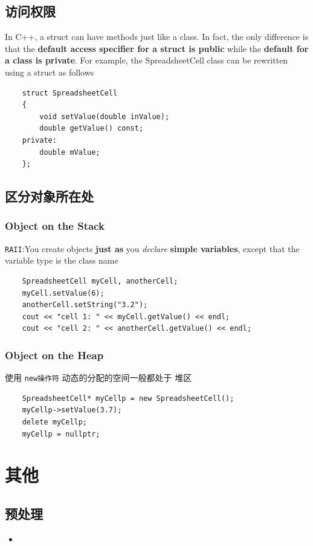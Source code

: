 \documentclass[UTF8,a4paper,12pt]{ctexbook} %
\begin{document}
	\subsection{访问权限}
		In C++, a struct can have methods just like a class. In fact, the only difference is that the \textbf{default
		access specifier for a struct is public} while the \textbf{default for a class is private}. For example, the
		SpreadsheetCell class can be rewritten using a struct as follows
		
		\begin{lstlisting}
	struct SpreadsheetCell
	{
		void setValue(double inValue);
		double getValue() const;
	private:
		double mValue;
	};
		\end{lstlisting}
	
	\subsection{区分对象所在处}
		\subsubsection{Object on the Stack}
			\verb|RAII|:You create objects \textbf{just as }you \textit{declare} \textbf{simple variables}, except that the variable type is the class
			name
			\begin{lstlisting}
	SpreadsheetCell myCell, anotherCell;
	myCell.setValue(6);
	anotherCell.setString("3.2");
	cout << "cell 1: " << myCell.getValue() << endl;
	cout << "cell 2: " << anotherCell.getValue() << endl;
			\end{lstlisting}
			
		\subsubsection{Object on the Heap}
			使用 \verb|new操作符| 动态的分配的空间一般都处于 堆区
		\begin{lstlisting}
	SpreadsheetCell* myCellp = new SpreadsheetCell();
	myCellp->setValue(3.7);
	delete myCellp;
	myCellp = nullptr;
		\end{lstlisting}
		
\section{其他}
		\subsection{预处理}
			\begin{itemize}
				\item 
			\end{itemize}
\end{document}
